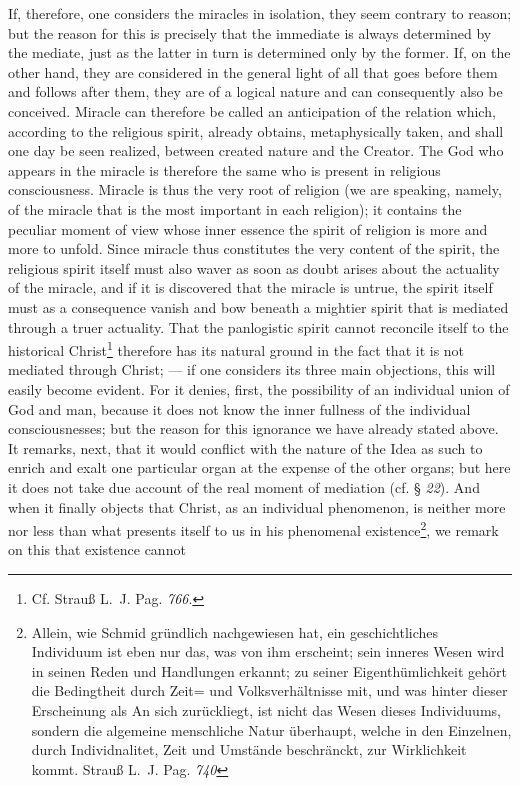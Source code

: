 \documentclass[12pt]{book}
\newcommand{\opage}[1]{\marginnote{\footnotesize\textit{[#1]}}}
\begin{document}
If, therefore, one considers the miracles in isolation, they seem contrary to
reason; but the reason for this is precisely that the immediate is always
determined by the mediate, just as the latter in turn is determined only by the
former. If, on the other hand, they are considered in the general
\opage{152} \setcounter{footnote}{0}%
light of all that goes before them and follows after them, they are of a logical
nature and can consequently also be conceived. Miracle can therefore be called
an anticipation of the relation which, according to the religious spirit, already
obtains, metaphysically taken, and shall one day be seen realized, between
created nature and the Creator. The God who appears in the miracle is therefore
the same who is present in religious consciousness. Miracle is thus the very root
of religion (we are speaking, namely, of the miracle that is the most important
in each religion); it contains the peculiar moment of view whose inner essence
the spirit of religion is more and more to unfold. Since miracle thus
constitutes the very content of the spirit, the religious spirit itself must also
waver as soon as doubt arises about the actuality of the miracle, and if it is
discovered that the miracle is untrue, the spirit itself must as a consequence
vanish and bow beneath a mightier spirit that is mediated through a truer
actuality. That the panlogistic spirit cannot reconcile itself to the historical
Christ\footnote{Cf. Strauß L.~J. Pag. \textit{766}.} therefore has its natural
ground in the fact that it is not mediated through Christ; --- if one considers
its three main objections, this will easily become evident. For it denies, first,
the possibility of an individual union of God and man, because it does not know
the inner fullness of the individual consciousnesses; but the reason for this
ignorance we have already stated above. It remarks, next, that it would conflict
with the nature of the Idea as such to enrich and exalt one particular organ at
the expense of the other organs; but here it does not take due account of the
real moment of mediation (cf. § \textit{22}). And when it finally objects that
Christ, as an individual phenomenon, is neither more nor
\opage{153} \setcounter{footnote}{0}%
less than what presents itself to us in his phenomenal
existence\footnote{Allein, wie Schmid gründlich nachgewiesen hat, ein
geschichtliches Individuum ist eben nur das, was von ihm erscheint; sein inneres
Wesen wird in seinen Reden und Handlungen erkannt; zu seiner Eigenthümlichkeit
gehört die Bedingtheit durch Zeit= und Volksverhältnisse mit, und was hinter
dieser Erscheinung als An sich zurückliegt, ist nicht das Wesen dieses
Individuums, sondern die algemeine menschliche Natur überhaupt, welche in den
Einzelnen, durch Individnalitet, Zeit und Umstände beschränckt, zur Wirklichkeit
kommt. Strauß L.~J. Pag. \textit{740}}, we remark on this that existence cannot
\end{document}
